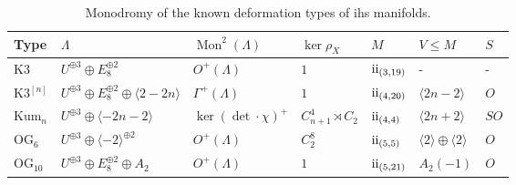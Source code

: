 \documentclass{amsart}
\theoremstyle{definition}
\theoremstyle{plain}
\newcommand{\RN}[1]{\textup{\uppercase\expandafter{\romannumeral#1}}}
\newcommand{\even}{\RN{2}}
\begin{document}
\begin{table}
\centering
\caption{Monodromy of the known deformation types of ihs manifolds.}\label{tbl:invariants}
\begin{tabular}{lllllll}
\toprule
Type& $\Lambda$ & $\mathop{\mathrm{Mon}}\nolimits^2(\Lambda)$ & $\ker \rho_X$ & $M$ & $V\leq M$ & $S$\\
\midrule
K3 & $U^{\oplus 3}\oplus E_8^{\oplus 2}$ & $ O^+(\Lambda)$ &  $1$ & $\even_{(3,19)}$& - & -\\
K3$^{[n]}$ & $U^{\oplus 3}\oplus E_8^{\oplus 2} \oplus \langle 2-2n \rangle$ & $ \Gamma^+(\Lambda)$ &  $1$ & $\even_{(4,20)}$& $\langle 2n-2 \rangle$ & $O$\\
Kum$_n$ & $U^{\oplus 3}\oplus \langle -2n-2 \rangle$ & $\ker (\det \cdot \chi)^+$ &  $C_{n+1}^4 \rtimes C_2$&$\even_{(4,4)}$&$\langle 2n+2 \rangle$ & $SO$\\
OG$_6$ & $U^{\oplus 3}\oplus \langle -2\rangle^{\oplus 2}$ & $O^+(\Lambda)$ & $C_2^8$& $\even_{(5,5)}$ & $\langle 2 \rangle\oplus \langle 2 \rangle$ & $O$\\
OG$_{10}$ & $U^{\oplus 3}\oplus E_8^{\oplus 2} \oplus A_2$ & $O^+(\Lambda)$ & $1$& $\even_{(5,21)}$&$A_2(-1)$& $O$\\
\bottomrule
\end{tabular}
\end{table}
\end{document}
